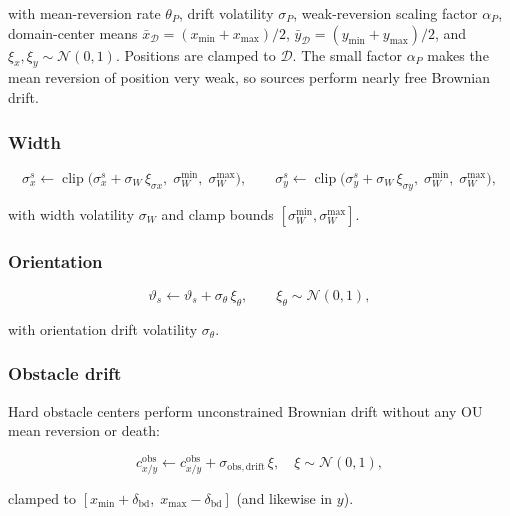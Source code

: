 \documentclass[11pt,a4paper]{article}
\begin{document}
with mean-reversion rate $\theta_P$, drift volatility $\sigma_P$,
weak-reversion scaling factor $\alpha_P$, domain-center means
$\bar{x}_{\mathcal{D}} = (x_{\min} + x_{\max})/2$,
$\bar{y}_{\mathcal{D}} = (y_{\min} + y_{\max})/2$,
and $\xi_x, \xi_y \sim \mathcal{N}(0,1)$.
Positions are clamped to $\mathcal{D}$.
The small factor $\alpha_P$ makes the mean reversion of position very weak,
so sources perform nearly free Brownian drift.

\subsubsection*{Width}

\begin{equation}
  \sigma_x^s \leftarrow \operatorname{clip}\!\bigl(
    \sigma_x^s + \sigma_W\,\xi_{\sigma x},\;\sigma_W^{\min},\;\sigma_W^{\max}\bigr),
  \qquad
  \sigma_y^s \leftarrow \operatorname{clip}\!\bigl(
    \sigma_y^s + \sigma_W\,\xi_{\sigma y},\;\sigma_W^{\min},\;\sigma_W^{\max}\bigr),
\end{equation}

with width volatility $\sigma_W$ and clamp bounds $[\sigma_W^{\min}, \sigma_W^{\max}]$.

\subsubsection*{Orientation}

\begin{equation}
  \vartheta_s \leftarrow \vartheta_s + \sigma_\theta\,\xi_\theta, \qquad
  \xi_\theta \sim \mathcal{N}(0,1),
\end{equation}

with orientation drift volatility $\sigma_\theta$.

\subsubsection*{Obstacle drift}

Hard obstacle centers perform unconstrained Brownian drift without any OU
mean reversion or death:

\begin{equation}
  c_{x/y}^{\mathrm{obs}} \leftarrow c_{x/y}^{\mathrm{obs}}
    + \sigma_{\mathrm{obs,drift}}\,\xi, \quad \xi \sim \mathcal{N}(0,1),
\end{equation}

clamped to $[x_{\min} + \delta_{\mathrm{bd}},\; x_{\max} - \delta_{\mathrm{bd}}]$
(and likewise in $y$).
\end{document}
